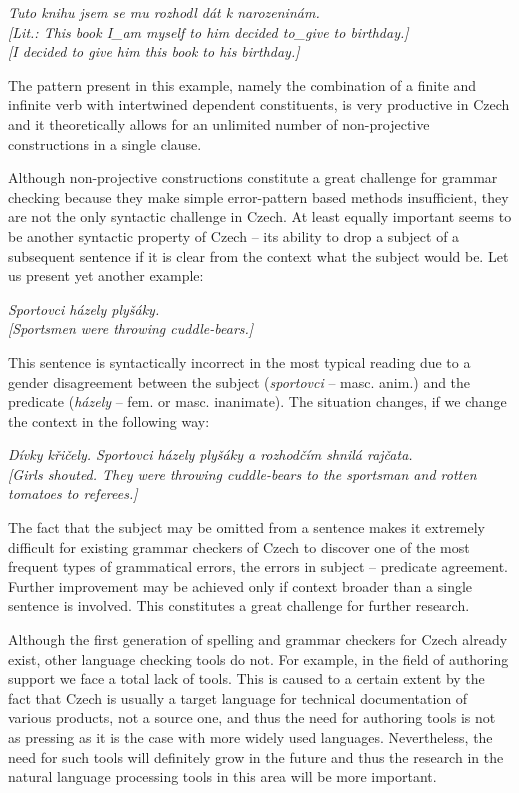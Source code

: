 \documentclass[]{../../metanetpaper}
\begin{document}
\begin{multicols}{2}
\textit{Tuto knihu jsem se mu rozhodl dát k narozeninám.\\
{[}Lit.: This book I\_am myself to him decided to\_give to birthday.{]}\\
{[}I decided to give him this book to his birthday.{]}}

The pattern present in this example, namely the combination of a finite and infinite verb with intertwined dependent constituents, is very productive in Czech and it theoretically allows for an unlimited number of non-projective constructions in a single clause.

Although non-projective constructions constitute a great challenge for grammar checking because they make simple error-pattern based methods insufficient, they are not the only syntactic challenge in Czech. At least equally important seems to be another syntactic property of Czech – its ability to drop a subject of a subsequent sentence if it is clear from the context what the subject would be. Let us present yet another example:

\textit{Sportovci házely plyšáky.\\
{[}Sportsmen were throwing cuddle-bears.{]}}

This sentence is syntactically incorrect in the most typical reading due to a gender disagreement between the subject (\textit{sportovci} – masc. anim.) and the predicate (\textit{házely} – fem. or masc. inanimate). The situation changes, if we change the context in the following way:

\textit{Dívky křičely. Sportovci házely plyšáky a rozhodčím shnilá rajčata.\\
{[}Girls shouted. They were throwing cuddle-bears to the sportsman and rotten tomatoes to referees.{]}}

The fact that the subject may be omitted from a sentence makes it extremely difficult for existing grammar checkers of Czech to discover one of the most frequent types of grammatical errors, the errors in subject – predicate agreement. Further improvement may be achieved only if context broader than a single sentence is involved. This constitutes a great challenge for further research.

Although the first generation of spelling and grammar checkers for Czech already exist, other language checking tools do not. For example, in the field of authoring support we face a total lack of tools. This is caused to a certain extent by the fact that Czech is usually a target language for technical documentation of various products, not a source one, and thus the need for authoring tools is not as pressing as it is the case with more widely used languages. Nevertheless, the need for such tools will definitely grow in the future and thus the research in the natural language processing tools in this area will be more important.


\end{multicols}
\end{document}
